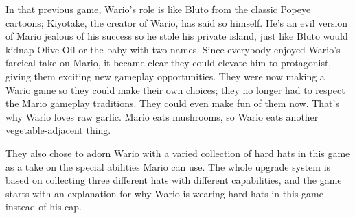 \documentclass{book}
\let\oldcenter\center
\let\oldendcenter\endcenter
\renewenvironment{center}{\setlength\topsep{0pt}\oldcenter}{\oldendcenter}
\begin{document}
In that previous game, Wario’s role is like Bluto from the classic Popeye cartoons; Kiyotake, the creator of Wario, has said so himself. He’s an evil version of Mario jealous of his success so he stole his private island, just like Bluto would kidnap Olive Oil or the baby with two names. Since everybody enjoyed Wario’s farcical take on Mario, it became clear they could elevate him to protagonist, giving them exciting new gameplay opportunities. They were now making a Wario game so they could make their own choices; they no longer had to respect the Mario gameplay traditions. They could even make fun of them now. That’s why Wario loves raw garlic. Mario eats mushrooms, so Wario eats another vegetable-adjacent thing.

They also chose to adorn Wario with a varied collection of hard hats in this game as a take on the special abilities Mario can use. The whole upgrade system is based on collecting three different hats with different capabilities, and the game starts with an explanation for why Wario is wearing hard hats in this game instead of his cap.

\begin{center}
\vspace{8pt}
\quad\vspace{4pt}
\quad\vspace{4pt}
\quad\vspace{4pt}
\end{center}
\end{document}

